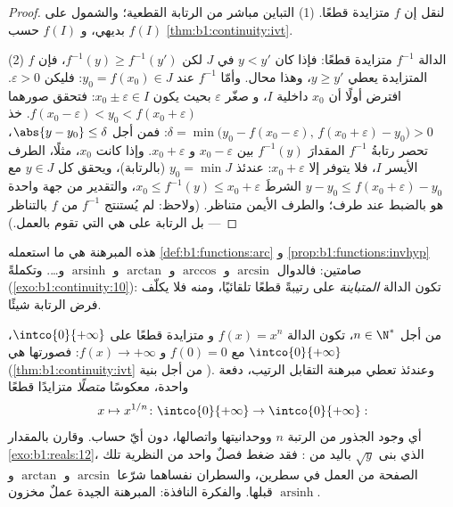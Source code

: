 \begin{proof}
لنقل إن $f$ متزايدة قطعًا. (1) التباين مباشر من
الرتابة القطعية؛ والشمول على $f(I)$ بديهي، و $f(I)$
 حسب \cref{thm:b1:continuity:ivt}.

(2) الدالة $f^{-1}$ متزايدة قطعًا: فإذا كان $y < y'$ في $J$ لكن $f^{-1}(y)
\geq f^{-1}(y')$، فإن  $f$ المتزايدة يعطي $y \geq y'$،
وهذا محال. وأمّا  $f^{-1}$ عند $y_0 = f(x_0) \in J$: فليكن
$\varepsilon > 0$. افترض أولًا أن $x_0$ داخلية  $I$، و
صغّر $\varepsilon$ بحيث يكون $x_0 \pm \varepsilon \in I$: فتحقق
صورهما $f(x_0 - \varepsilon) < y_0 < f(x_0 +
\varepsilon)$. خذ
$\delta = \min\bigl(y_0 - f(x_0 - \varepsilon),\, f(x_0 +
\varepsilon) - y_0\bigr) > 0$: فمن أجل $\abs{y - y_0} \leq \delta$،
تحصر رتابةُ $f^{-1}$ المقدارَ $f^{-1}(y)$ بين $x_0 -
\varepsilon$ و $x_0 + \varepsilon$. وإذا كانت $x_0$، مثلًا، الطرف
الأيسر  $I$، فلا يتوفر إلا $x_0 + \varepsilon$: عندئذ
$y_0 = \min J$ (بالرتابة)، ويحقق كل $y \in J$ مع $y - y_0
\leq f(x_0 + \varepsilon) - y_0$ الشرطَ $x_0 \leq f^{-1}(y)
\leq x_0 + \varepsilon$، والتقدير من جهة واحدة هو بالضبط
 عند طرف؛ والطرف الأيمن متناظر.
(ولاحظ: لم يُستنتج  $f^{-1}$
من  $f$ بالتناظر --- بل الرتابة على  هي التي تقوم بالعمل.)
\end{proof}

\begin{remark}
هذه المبرهنة هي ما استعمله \cref{def:b1:functions:arc} و
\cref{prop:b1:functions:invhyp} صامتين: فالدوال $\arcsin$ و $\arccos$ و
$\arctan$ و $\operatorname{arsinh}$ و\dots {}. وتكملةً
(\cref{exo:b1:continuity:10}): تكون الدالة 
\emph{المتباينة} على  رتيبةً قطعًا تلقائيًا، ومنه فلا يكلّف
فرض الرتابة شيئًا.
\end{remark}

\begin{example}\label{ex:b1:continuity:nthroot}
من أجل $n \in \N^*$، تكون الدالة $f(x) = x^n$  و
متزايدة قطعًا على $\intco{0}{+\infty}$، مع $f(0) = 0$ و
$f(x) \to +\infty$: فصورتها هي $\intco{0}{+\infty}$
(\cref{thm:b1:continuity:ivt} من أجل بنية ). وعندئذ
تعطي مبرهنة التقابل الرتيب، دفعة واحدة، معكوسًا
\emph{متصلًا} متزايدًا قطعًا
\[
x \mapsto x^{1/n} \colon \intco{0}{+\infty} \to
\intco{0}{+\infty} :
\]
أي وجود الجذور من الرتبة $n$ ووحدانيتها واتصالها، دون أيّ
حساب. وقارن بالمقدار \cref{exo:b1:reals:12}، الذي بنى
$\sqrt y$ باليد من : فقد ضغط فصلٌ واحد من النظرية
تلك الصفحة من العمل في سطرين، والسطران نفساهما
شرّعا $\arcsin$ و $\arctan$ و
$\operatorname{arsinh}$ قبلها. والفكرة النافذة: المبرهنة الجيدة
عملٌ مخزون.
\end{example}


